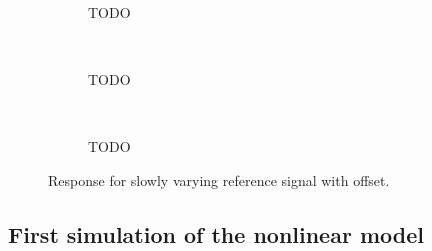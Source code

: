 \documentclass[11pt]{article}
\begin{document}
\begin{enumerate}
\begin{figure}[ht]
        \begin{subfigure}[c]{0.3\linewidth}
            \centering
            \caption{TODO}
        \end{subfigure}
        ~
        \begin{subfigure}[c]{0.3\linewidth}
            \centering
            \caption{TODO}
        \end{subfigure}
        ~
        \begin{subfigure}[c]{0.3\linewidth}
            \centering
            \caption{TODO}
        \end{subfigure}
        \caption{Response for slowly varying reference signal with offset.}
        \label{fig:varying_reference_with_offset}
    \end{figure}
\end{enumerate}



\subsection*{First simulation of the nonlinear model} %
\label{sub:first_simulation_of_the_nonlinear_model}
\end{document}
